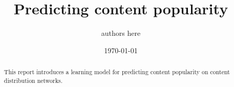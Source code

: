 \documentclass{article}   %
\begin{document}
	\title{Predicting content popularity}  

	\author{
       authors here\\
	}
	\date{\today}  
	\maketitle

	\begin{abstract}
      This report introduces a learning model for predicting content popularity on content distribution networks.

	\end{abstract}


	
	
%	

%	
%	
\end{document}
